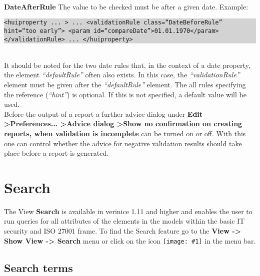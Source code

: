 \documentclass[a4paper,10pt]{book}
\newcommand{\icon}[1]{\texttt{[image: \#1]}}
\begin{document}
\newline\\
\textbf{DateAfterRule}
\newline
The value to be checked must be after a given date.
\newline
Example:
\newline\\
\colorbox{lightgray}{\parbox{\textwidth}{
{\tt <huiproperty ... >\newline
   ...\newline
   <validationRule class=``DateBeforeRule'' hint=``too early''>\newline
      <param id=``compareDate''>01.01.1970</param>\newline
   </validationRule>\newline
   ...\newline
</huiproperty>}
}}
\newline\\
It should be noted for the two date rules that, in the context of a date property, the element \textit{``defaultRule''} often also exists. In this case, the \textit{``validationRule''} element must be given after the \textit{``defaultRule''} element.
\newline
The all rules specifying the reference (\textit{``hint''}) is optional.
If this is not specified, a default value will be used.
\newline\\
Before the output of a report a further advice dialog under \textbf{Edit \textgreater Preferences... \textgreater Advice dialog \textgreater Show no confirmation on creating reports, when validation is incomplete} can be turned on or off.
With this one can control whether the advice for negative validation results should take place before a report is generated.

\section{Search}
\label{sec:search}

The View \textbf{Search} is available in verinice 1.11 and higher and
enables the user to run queries for all attributes of the elements in
the models within the basic IT security and ISO 27001 frame. To find
the Search feature go to the \textbf{View -> Show View -> Search} menu
or click on the icon \icon{Icon/search.png} in
the menu bar.

\subsection{Search terms}
\label{sec:search-terms}
\end{document}

